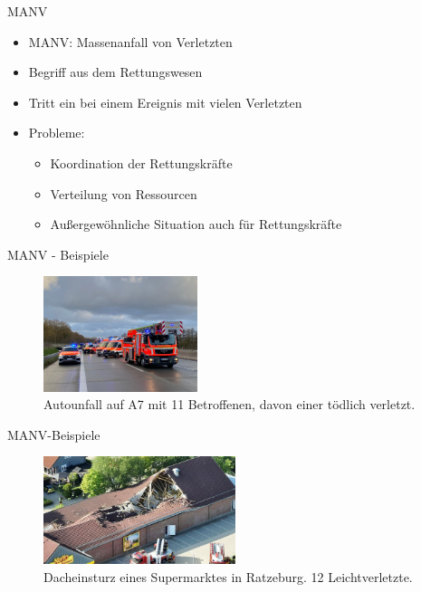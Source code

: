 \begin{frame}{MANV}
	\begin{itemize}
		\item MANV: \alert{Massenanfall von Verletzten}
		\item Begriff aus dem Rettungswesen
		\item Tritt ein bei einem Ereignis mit vielen Verletzten
		\item Probleme:
		      \begin{itemize}
			      \item Koordination der Rettungskräfte
			      \item Verteilung von Ressourcen
			      \item Außergewöhnliche Situation auch für Rettungskräfte
		      \end{itemize}
	\end{itemize}
\end{frame}

\begin{frame}{MANV - Beispiele}
	\begin{examples}
		\begin{figure}
			\begin{center}
				\includegraphics[width=0.4\textwidth]{images/autounfall.jpg}
			\end{center}
			\caption{Autounfall auf A7 mit 11 Betroffenen, davon einer tödlich verletzt.\cite{manv-a7}}\label{fig:autounfall}
		\end{figure}
	\end{examples}
\end{frame}

\begin{frame}{MANV-Beispiele}
	\begin{examples}
		\begin{figure}
			\begin{center}
				\includegraphics[width=0.5\textwidth]{images/ratzeburg-netto.jpg}
			\end{center}
			\caption{Dacheinsturz eines Supermarktes in Ratzeburg. 12 Leichtverletzte.\cite{manv-ratzeburg}}\label{fig:netto}
		\end{figure}
	\end{examples}
\end{frame}

